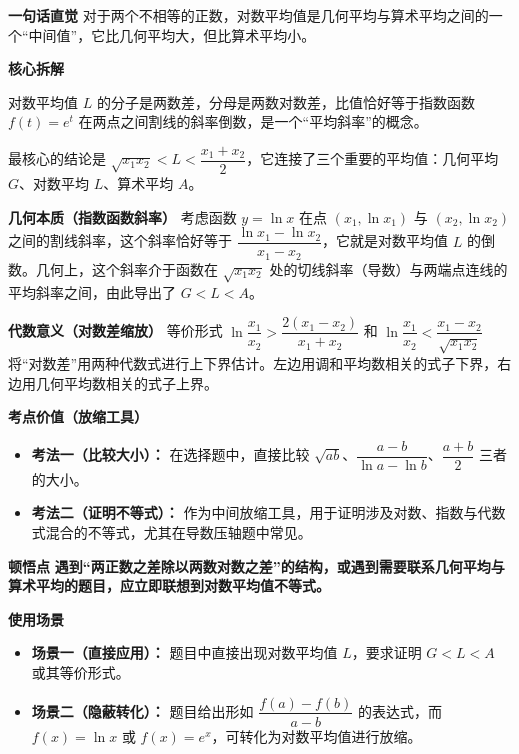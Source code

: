 \begin{explanationbox}
\textbf{\textcolor{CExplanation}{一句话直觉}}
对于两个不相等的正数，对数平均值是几何平均与算术平均之间的一个“中间值”，它比几何平均大，但比算术平均小。

\medskip
\textbf{\textcolor{CExplanation}{核心拆解}}
\begin{description}[style=nextline, leftmargin=2.8em, labelsep=0.5em, itemsep=0.45em]
    \item[\textbf{要点一（定义结构）：}] 对数平均值 $L$ 的分子是两数差，分母是两数对数差，比值恰好等于指数函数 $f(t)=e^t$ 在两点之间割线的斜率倒数，是一个“平均斜率”的概念。
    \item[\textbf{要点二（不等式链）：}] 最核心的结论是 $\sqrt{x_1 x_2} < L < \dfrac{x_1+x_2}{2}$，它连接了三个重要的平均值：几何平均 $G$、对数平均 $L$、算术平均 $A$。
\end{description}

\medskip
\textbf{\textcolor{CExplanation}{几何本质（指数函数斜率）}}
考虑函数 $y=\ln x$ 在点 $(x_1,\ln x_1)$ 与 $(x_2,\ln x_2)$ 之间的割线斜率，这个斜率恰好等于 $\dfrac{\ln x_1-\ln x_2}{x_1-x_2}$，它就是对数平均值 $L$ 的倒数。几何上，这个斜率介于函数在 $\sqrt{x_1x_2}$ 处的切线斜率（导数）与两端点连线的平均斜率之间，由此导出了 $G<L<A$。

\medskip
\textbf{\textcolor{CExplanation}{代数意义（对数差缩放）}}
等价形式 $\ln\dfrac{x_1}{x_2} > \dfrac{2(x_1-x_2)}{x_1+x_2}$ 和 $\ln\dfrac{x_1}{x_2} < \dfrac{x_1-x_2}{\sqrt{x_1x_2}}$ 将“对数差”用两种代数式进行上下界估计。左边用调和平均数相关的式子下界，右边用几何平均数相关的式子上界。

\medskip
\textbf{\textcolor{CExplanation}{考点价值（放缩工具）}}
\begin{itemize}[leftmargin=*, itemsep=0.5em, topsep=0.4em]
    \item \textbf{考法一（比较大小）：} 在选择题中，直接比较 $\sqrt{ab}$、$\dfrac{a-b}{\ln a-\ln b}$、$\dfrac{a+b}{2}$ 三者的大小。
    \item \textbf{考法二（证明不等式）：} 作为中间放缩工具，用于证明涉及对数、指数与代数式混合的不等式，尤其在导数压轴题中常见。
\end{itemize}

\medskip
\textbf{\textcolor{CExplanation}{顿悟点}}
\textbf{遇到“两正数之差除以两数对数之差”的结构，或遇到需要联系几何平均与算术平均的题目，应立即联想到对数平均值不等式。}

\medskip
\textbf{\textcolor{CExplanation}{使用场景}}
\begin{itemize}[leftmargin=*, itemsep=0.5em, topsep=0.4em]
    \item \textbf{场景一（直接应用）：} 题目中直接出现对数平均值 $L$，要求证明 $G<L<A$ 或其等价形式。
    \item \textbf{场景二（隐蔽转化）：} 题目给出形如 $\dfrac{f(a)-f(b)}{a-b}$ 的表达式，而 $f(x)=\ln x$ 或 $f(x)=e^x$，可转化为对数平均值进行放缩。
\end{itemize}
\end{explanationbox}
